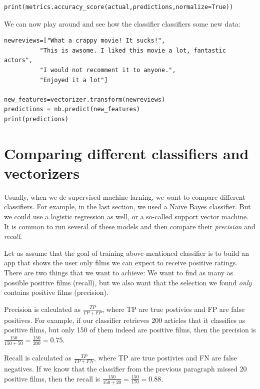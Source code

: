 \documentclass[a4paper,12pt]{book}
\begin{document}
\begin{lstlisting}
print(metrics.accuracy_score(actual,predictions,normalize=True))
\end{lstlisting}

We can now play around and see how the classifier classifiers some new data:




\begin{lstlisting}
newreviews=["What a crappy movie! It sucks!",
          "This is awsome. I liked this movie a lot, fantastic actors",
          "I would not recomment it to anyone.",
          "Enjoyed it a lot"]

new_features=vectorizer.transform(newreviews)
predictions = nb.predict(new_features)
print(predictions)

\end{lstlisting}



\section{Comparing different classifiers and vectorizers}
Usually, when we de supervised machine larning, we want to compare different classifiers. For example, in the last section, we used a Naïve Bayes classifier. But we could use a logistic regression as well, or a so-called support vector machine. It is common to run several of these models and then compare their \emph{precision} and \emph{recall}. 

Let us assume that the goal of training above-mentioned classifier is to build an app that shows the user only films we can expect to receive positive ratings. There are two things that we want to achieve: We want to find as many as possible positive films (recall), but we also want that the selection we found \emph{only} contains positive films (precision).

Precision is calculated as $\frac{TP}{TP+FP}$, where TP are true postivies and FP are false positives. For example, if our classifier retrieves 200 articles that it classifies as positive films, but only 150 of them indeed are positive films, then the precision is $\frac{150}{150+50} = \frac{150}{200} = 0.75$.

Recall is calculated as $\frac{TP}{TP+FN}$, where TP are true postivies and FN are false negatives. If we know that the classifier from the previous paragraph missed 20 positive films, then the recall is $\frac{150}{150+20} = \frac{150}{170}= 0.88$.
\end{document}
